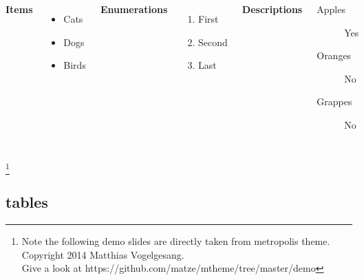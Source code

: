 \documentclass[9pt,aspectratio=169]{ctexbeamer}
\begin{document}
\begin{frame}{\secname}{\subsecname}
   \begin{columns}[T,onlytextwidth]
      \textbf{Items}
      \begin{itemize}
        \item Cats \item Dogs \item Birds
      \end{itemize}

      \textbf{Enumerations}
      \begin{enumerate}
        \item First \item Second \item Last
      \end{enumerate}

      \textbf{Descriptions}
      \begin{description}
        \item[Apples] Yes \item[Oranges] No \item[Grappes] No
      \end{description}
\end{columns}
\let\thefootnote\relax\footnote{Note the following demo slides are directly taken from metropolis theme. Copyright 2014 Matthias Vogelgesang.\\
Give a look at https://github.com/matze/mtheme/tree/master/demo}
\end{frame}

\subsection{tables}
\end{document}
